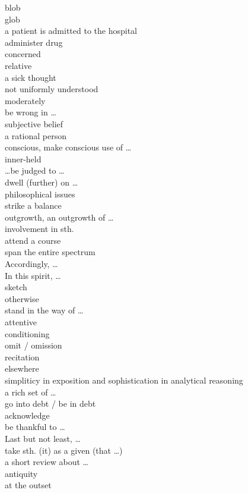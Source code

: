 \documentclass[12pt]{article}
\begin{document}
blob \\ 
glob \\ 
a patient is admitted to the hospital \\
administer drug \\
concerned \\
relative \\
a sick thought \\
not uniformly understood \\
moderately \\
be wrong in \dots \\
subjective belief \\
a rational person \\
conscious, make conscious use of \dots \\
inner-held \\
\dots be judged to \dots \\
dwell (further) on \dots \\
philosophical issues \\
strike a balance \\
outgrowth, an outgrowth of \dots \\
involvement in sth. \\
attend a course \\
span the entire spectrum \\
Accordingly, \dots \\
In this spirit, \dots \\
sketch \\
otherwise \\
stand in the way of \dots \\
attentive \\
conditioning \\
omit / omission \\
recitation \\
elsewhere \\
simpliticy in exposition and sophistication in analytical reasoning \\
a rich set of \dots \\
go into debt / be in debt \\
acknowledge \\
be thankful to \dots \\
Last but not least, \dots \\
take sth. (it) as a given (that \dots)\\
a short review about \dots \\
antiquity\\
at the outset \\
\end{document}
